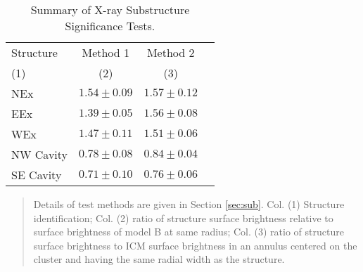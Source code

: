\begin{table*}
  \caption{\sc Summary of X-ray Substructure Significance Tests.\label{tab:sig}}
  \begin{tabular}{lccc}
    \hline
    \hline
    Structure & Method 1 & Method 2\\
    (1) & (2) & (3)\\
    \hline
    NEx       & $1.54 \pm 0.09$ & $1.57 \pm 0.12$\\
    EEx       & $1.39 \pm 0.05$ & $1.56 \pm 0.08$\\
    WEx       & $1.47 \pm 0.11$ & $1.51 \pm 0.06$\\
    NW Cavity & $0.78 \pm 0.08$ & $0.84 \pm 0.04$\\
    SE Cavity & $0.71 \pm 0.10$ & $0.76 \pm 0.06$\\
    \hline
  \end{tabular}
  \begin{quote}
    Details of test methods are given in Section
    \ref{sec:sub}. Col. (1) Structure identification; Col. (2) ratio
    of structure surface brightness relative to surface brightness of
    model B at same radius; Col. (3) ratio of structure surface
    brightness to ICM surface brightness in an annulus centered on the
    cluster and having the same radial width as the structure.
  \end{quote}
\end{table*}
